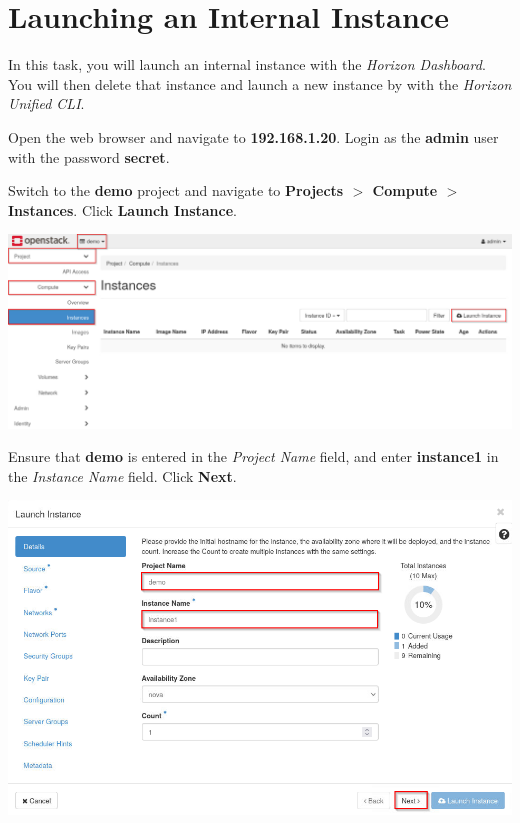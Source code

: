 \documentclass[letterpaper, 12pt]{article}
\begin{document}
\section{Launching an Internal Instance}\label{sec:launching_an_internal_instance}
In this task, you will launch an internal instance with the \textit{Horizon Dashboard}.
You will then delete that instance and launch a new instance by with the \textit{Horizon Unified CLI}.

\begin{enumerate}
    \begin{labstep}
        Open the web browser and navigate to \textbf{192.168.1.20}.
        Login as the \textbf{admin} user with the password \textbf{secret}.
    \end{labstep}

    \begin{labstep}
        Switch to the \textbf{demo} project and navigate to \textbf{Projects $>$ Compute $>$ Instances}.
        Click \textbf{Launch Instance}.

        \begin{center}
            \includegraphics[width=\linewidth]{images/part4/step2.png}
        \end{center}
    \end{labstep}

    \begin{labstep}
        Ensure that \textbf{demo} is entered in the \textit{Project Name} field, and enter \textbf{instance1} in the \textit{Instance Name} field.
        Click \textbf{Next}.

        \begin{center}
            \includegraphics[width=\linewidth]{images/part4/step3.png}
        \end{center}
    \end{labstep}


\end{enumerate}
\end{document}
